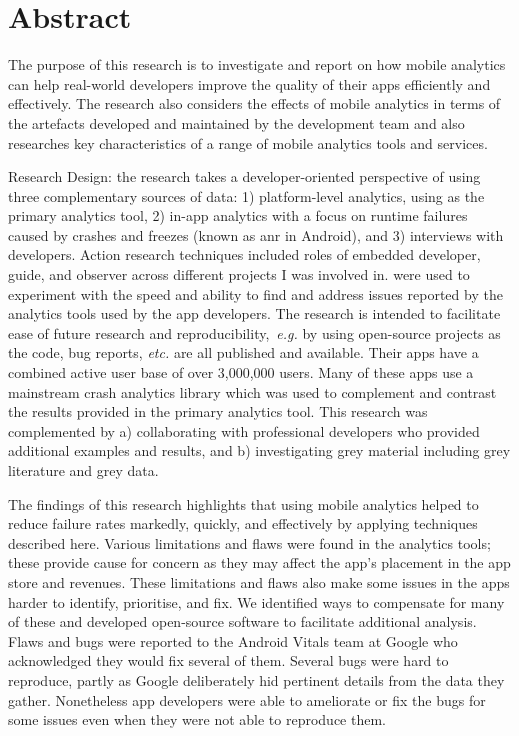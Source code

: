 \chapter*{Abstract}

The purpose of this research is to investigate and report on how mobile analytics can help
real-world developers improve the quality of their apps efficiently and effectively. The research also considers the effects of mobile analytics in terms of the artefacts developed and maintained by the development team and also researches key characteristics of a range of mobile analytics tools and services. %

Research Design: the research takes a developer-oriented perspective of using three complementary sources of data: 1) platform-level analytics, using  as the primary analytics tool, 2) in-app analytics with a focus on runtime failures caused by crashes and freezes (known as \Gls{anr} in Android), and 3) interviews with developers.
%
Action research techniques included roles of embedded developer, guide, and observer across different projects I was involved in.  were used to experiment with the speed and ability to find and address issues reported by the analytics tools used by the app developers. 
%
The research is intended to facilitate ease of future research and reproducibility,~\emph{e.g.} by using  open-source projects as the code, bug reports, \emph{etc.} are all published and available. Their apps have a combined active user base of over 3,000,000 users. Many of these apps use a mainstream crash analytics library which was used to complement and contrast the results provided in the primary analytics tool.
%
This research was complemented by a) collaborating with professional developers who provided additional examples and results, and b) investigating grey material including grey literature and grey data.

The findings of this research highlights that using mobile analytics helped to reduce failure rates markedly, quickly, and effectively by applying techniques described here.
Various limitations and flaws were found in the analytics tools; these provide cause for concern as they may affect the app's placement in the app store and revenues. These limitations and flaws also make some issues in the apps harder to identify, prioritise, and fix. We identified ways to compensate for many of these and developed open-source software to facilitate additional analysis. Flaws and bugs were reported to the Android Vitals team at Google who acknowledged they would fix several of them.
%
Several bugs were hard to reproduce, partly as Google deliberately hid pertinent details from the data they gather. Nonetheless app developers were able to ameliorate or fix the bugs for some issues even when they were not able to reproduce them. 

